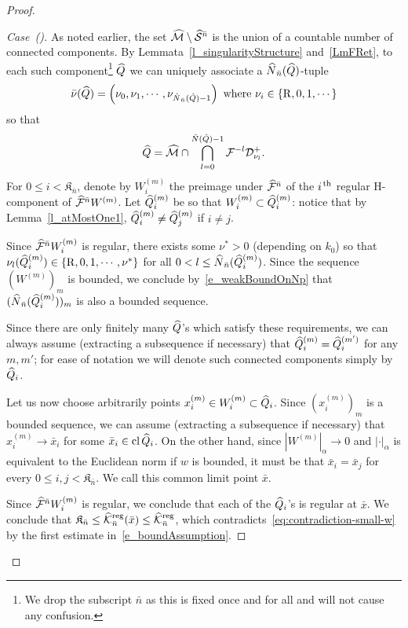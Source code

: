 \documentclass[10pt]{amsart}
\theoremstyle{definition}\newtheorem{defi}[theo]{Definition}\newtheorem{rema}[theo]{Remark}\newtheorem{exam}[theo]{Example}\newtheorem{exem}[theo]{Example}\newtheorem{nota}[theo]{Notation}
\newcommand{\cl}[1]{\mathrm{cl}\,#1}
\newcommand{\cm}{\mathcal{F}}
\newcommand{\cell}{\mathcal{D}}
\newcommand{\csp}{\mathcal{M}}
\newcommand{\cmp}{\hat\cm}
\newcommand{\cspi}{\widehat{\csp}}
\newcommand{\brn}{\bar{n}}
\newcommand{\Hcomp}{H-\hskip0pt component}
\newcommand{\recoPrivate}{\mathrm{R}}
\newcommand{\singPrivate}{\mathcal{S}}
\newcommand{\singp}[1]{\hat{\singPrivate}^{#1}}
\newcommand{\cc}{\hat Q}
\newcommand{\ccseq}[1]{\privSeq\cc{#1}}
\newcommand{\xseq}[1]{\privSeq x{#1}}
\newcommand{\indTuple}{\bar\indCell}
\newcommand{\ckregp}{\hat{\mathcal{K}}^\text{reg}}
\newcommand{\adm}{_{\alpha^{+}}}
\newcommand{\Np}{\hat N}
\newcommand{\indCell}{\nu}
\newcommand{\redCell}{{\indCell^*}}
\newcommand{\privSeq}[2]{#1^{(#2)}}
\newcommand{\Wseq}[1]{\privSeq{W}{#1}}
\newcommand*\Kn{{\mathfrak{K}_{\brn}}}
\renewcommand{\adm}{_{\alpha}}
\newcounter{casecount}
\renewcommand*\thecasecount{(\alph{casecount})}
\newenvironment{case}{\refstepcounter{casecount}\begin{proof}[{Case~\thecasecount}]}{\let\qed\relax\end{proof}}
\let\oldhat\hat
\renewcommand*{\hat}[1]{\mathchoice{\widehat{#1}}{\widehat{#1}}{\oldhat{#1}}{\oldhat{#1}}}
\begin{document}
\begin{proof}
\begin{case}
As noted earlier, the set $\cspi\setminus\singp{\brn}$ is the union of a countable number of connected components. By Lemmata~\ref{l_singularityStructure} and~\ref{LmFRet}, to each such component\footnote{We drop the subscript $\brn$ as this is fixed once and for all and will not cause any confusion.} $\cc$ we can uniquely associate a $\Np_{\brn}(\cc)$-tuple
\begin{align*}
\indTuple(\cc) = \left(\indCell_0,\indCell_1,\cdots,\indCell_{\Np_{\brn}(\cc)-1}\right)
\textrm{ where } \indCell_i\in\{\recoPrivate,0,1,\cdots\}
\end{align*}
so that
\begin{align*}
\cc = \cspi \cap \bigcap_{l = 0}^{\Np(\cc)-1}\cm^{-l}\cell^+_{\indCell_l}.
\end{align*}
For $0\le i < \Kn$, denote by $\Wseq{m}_i$ the preimage under $\cmp^{\brn}$ of the $i^{\,\rm th}$ regular \Hcomp{} of $\cmp^{\brn}\Wseq m$. Let $\ccseq{m}_i$ be so that $\Wseq{m}_i\subset\ccseq{m}_i$: notice that by Lemma~\ref{l_atMostOne1}, $\ccseq{m}_i\ne\ccseq{m}_j$ if $i\ne j$.

Since $\cmp^{\brn}\Wseq{m}_i$ is regular, there exists some $\redCell > 0$ (depending on $k_{0}$) so that $\indCell_l(\ccseq{m}_{i}) \in\{\recoPrivate,0,1,\cdots,\redCell\}$ for all $0 < l \le \Np_{\brn}(\ccseq{m}_{i})$. Since the sequence $(\Wseq{m})_m$ is bounded, we conclude by~\eqref{e_weakBoundOnNp} that $(\Np_{\brn}(\ccseq{m}_i))_{m}$ is also a bounded sequence.

Since there are only finitely many $\cc$'s which satisfy these requirements, we can always assume (extracting a subsequence if necessary) that $\ccseq{m}_i = \ccseq{m'}_i$ for any $m,m'$; for ease of notation we will denote such connected components simply by $\cc_i$.

Let us now choose arbitrarily points $\xseq{m}_i\in\Wseq{m}_i\subset\cc_i$. Since $(\xseq{m}_i)_m$ is a bounded sequence, we can assume (extracting a subsequence if necessary) that $\xseq{m}_i\to\bar x_i$ for some $\bar x_i\in\cl\cc_i$. On the other hand, since $|\Wseq{m}|\adm\to0$ and $|\cdot|\adm$ is equivalent to the Euclidean norm if $w$ is bounded, it must be that $\bar x_i = \bar x_j$ for every $0\le i,j < \Kn $. We call this common limit point $\bar x$.

Since $\cmp^{\brn}\Wseq{m}_i$ is regular, we conclude that each of the $\cc_i$'s is regular at $\bar x$. We conclude that $\Kn \leq \ckregp_{\bar n}(\bar x)\leq \ckregp_{\bar n}$, which contradicts~\eqref{eq:contradiction-small-w} by the first estimate in~\eqref{e_boundAssumption}.
\end{case}


\end{proof}
\end{document}

